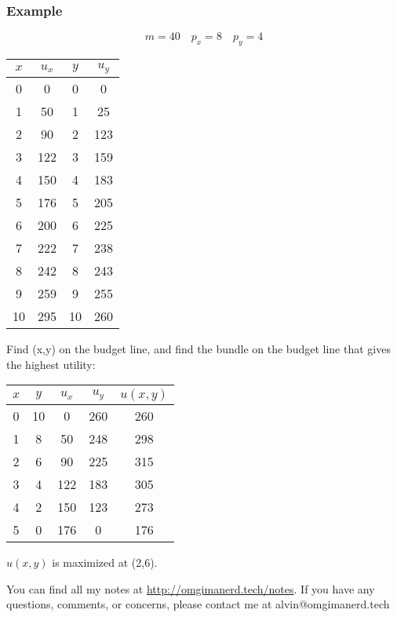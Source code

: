 \documentclass{article}
\begin{document}
\subsubsection{Example}
\[ m = 40 \quad p_{x} = 8 \quad p_{y} = 4 \]
\begin{center}
  \begin{tabular}{|c|c|c|c|}
    \hline
    \( x \) & \( u_{x} \) & \(y \) & \( u_{y} \) \\ \hline
    0       & 0           & 0      & 0           \\ \hline
    1       & 50          & 1      & 25          \\ \hline
    2       & 90          & 2      & 123         \\ \hline
    3       & 122         & 3      & 159         \\ \hline
    4       & 150         & 4      & 183         \\ \hline
    5       & 176         & 5      & 205         \\ \hline
    6       & 200         & 6      & 225         \\ \hline
    7       & 222         & 7      & 238         \\ \hline
    8       & 242         & 8      & 243         \\ \hline
    9       & 259         & 9      & 255         \\ \hline
    10      & 295         & 10     & 260         \\ \hline
  \end{tabular}
\end{center}
Find (x,y) on the budget line, and find the bundle on the budget line that
gives the highest utility:
\begin{center}
  \begin{tabular}{|c|c|c|c|c|}
    \hline
    \( x \) & \( y \) & \( u_{x} \) & \( u_{y} \) & \( u(x,y) \) \\ \hline
    0       & 10      & 0           & 260         & 260          \\ \hline
    1       & 8       & 50          & 248         & 298          \\ \hline
    2       & 6       & 90          & 225         & 315          \\ \hline
    3       & 4       & 122         & 183         & 305          \\ \hline
    4       & 2       & 150         & 123         & 273          \\ \hline
    5       & 0       & 176         & 0           & 176          \\ \hline
  \end{tabular}
\end{center}
\( u(x,y) \) is maximized at (2,6).

\begin{center}
  You can find all my notes at \url{http://omgimanerd.tech/notes}. If you have
  any questions, comments, or concerns, please contact me at
  alvin@omgimanerd.tech
\end{center}
\end{document}
